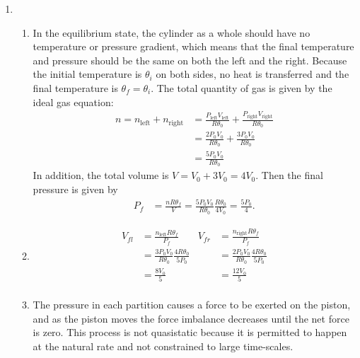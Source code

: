 \documentclass[a4paper,12pt]{article}
\begin{document}
\begin{enumerate}
    \item
        \begin{enumerate}
            \item
                In the equilibrium state, the cylinder as a whole should have no temperature or pressure gradient, which means that the final temperature and pressure should be the same on both the left and the right. Because the initial temperature is $\theta_i$ on both sides, no heat is transferred and the final temperature is $\theta_f = \theta_i$. The total quantity of gas is given by the ideal gas equation:
                \begin{align*}
                    n = n_\text{left} + n_\text{right} &= \frac{P_\text{left} V_\text{left}}{R \theta_0} + \frac{P_\text{right} V_\text{right}}{R \theta_0} \\
                    &= \frac{2 P_0 V_0}{R \theta_0} + \frac{3 P_0 V_0}{R \theta_0} \\
                    &= \frac{5 P_0 V_0}{R \theta_0}
                \end{align*}
                In addition, the total volume is $V = V_0 + 3V_0 = 4V_0$. Then the final pressure is given by
                \begin{align*}
                    P_f &= \frac{n R \theta_f}{V} = \frac{5 P_0 V_0}{R \theta_0} \frac{R \theta_0}{4V_0} = \frac{5 P_0}{4}.
                \end{align*}

            \item
                \begin{align*}
                    V_{fl} &= \frac{n_\text{left} R \theta_f}{P_f} & V_{fr} &= \frac{n_\text{right} R \theta_f}{P_f} \\
                    &= \frac{3 P_0 V_0}{R \theta_0} \frac{4 R \theta_0}{5 P_0} & &= \frac{2 P_0 V_0}{R \theta_0} \frac{4 R \theta_0}{5 P_0} \\
                    &= \frac{8V_0}{5} & &= \frac{12V_0}{5} \\
                \end{align*}

            \item
                The pressure in each partition causes a force to be exerted on the piston, and as the piston moves the force imbalance decreases until the net force is zero. This process is not quasistatic because it is permitted to happen at the natural rate and not constrained to large time-scales.
        \end{enumerate}


\end{enumerate}
\end{document}
